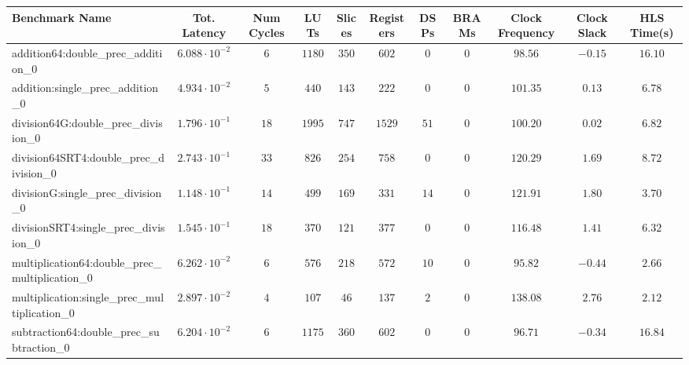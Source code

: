 \begin{tabular}{|l|c|c|c|c|c|c|c|c|c|c|}
\hline
Benchmark Name                                   & Tot. Latency            & Num Cycles & LUTs     & Slices   & Registers & DSPs   & BRAMs & Clock Frequency & Clock Slack & HLS Time(s) \\
\hline
addition64:double\_prec\_addition\_0             & $ 6.088 \cdot 10^{-2} $ & $ 6      $ & $ 1180 $ & $ 350  $ & $ 602   $ & $ 0  $ & $ 0 $ & $ 98.56       $ & $ -0.15   $ & $ 16.10   $ \\
addition:single\_prec\_addition\_0               & $ 4.934 \cdot 10^{-2} $ & $ 5      $ & $ 440  $ & $ 143  $ & $ 222   $ & $ 0  $ & $ 0 $ & $ 101.35      $ & $ 0.13    $ & $ 6.78    $ \\
division64G:double\_prec\_division\_0            & $ 1.796 \cdot 10^{-1} $ & $ 18     $ & $ 1995 $ & $ 747  $ & $ 1529  $ & $ 51 $ & $ 0 $ & $ 100.20      $ & $ 0.02    $ & $ 6.82    $ \\
division64SRT4:double\_prec\_division\_0         & $ 2.743 \cdot 10^{-1} $ & $ 33     $ & $ 826  $ & $ 254  $ & $ 758   $ & $ 0  $ & $ 0 $ & $ 120.29      $ & $ 1.69    $ & $ 8.72    $ \\
divisionG:single\_prec\_division\_0              & $ 1.148 \cdot 10^{-1} $ & $ 14     $ & $ 499  $ & $ 169  $ & $ 331   $ & $ 14 $ & $ 0 $ & $ 121.91      $ & $ 1.80    $ & $ 3.70    $ \\
divisionSRT4:single\_prec\_division\_0           & $ 1.545 \cdot 10^{-1} $ & $ 18     $ & $ 370  $ & $ 121  $ & $ 377   $ & $ 0  $ & $ 0 $ & $ 116.48      $ & $ 1.41    $ & $ 6.32    $ \\
multiplication64:double\_prec\_multiplication\_0 & $ 6.262 \cdot 10^{-2} $ & $ 6      $ & $ 576  $ & $ 218  $ & $ 572   $ & $ 10 $ & $ 0 $ & $ 95.82       $ & $ -0.44   $ & $ 2.66    $ \\
multiplication:single\_prec\_multiplication\_0   & $ 2.897 \cdot 10^{-2} $ & $ 4      $ & $ 107  $ & $ 46   $ & $ 137   $ & $ 2  $ & $ 0 $ & $ 138.08      $ & $ 2.76    $ & $ 2.12    $ \\
subtraction64:double\_prec\_subtraction\_0       & $ 6.204 \cdot 10^{-2} $ & $ 6      $ & $ 1175 $ & $ 360  $ & $ 602   $ & $ 0  $ & $ 0 $ & $ 96.71       $ & $ -0.34   $ & $ 16.84   $ \\

\end{tabular}
